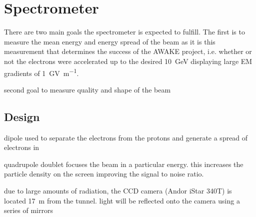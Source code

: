 
\section{Spectrometer}
\label{sec:spectrometer}

There are two main goals the spectrometer is expected to fulfill. The first is
to measure the mean energy and energy spread of the beam as it is this
measurement that determines the success of the AWAKE project, i.e.  whether or
not the electrons were accelerated up to the desired
\SI{10}{\giga\electronvolt} displaying large EM gradients of
\SI{1}{\giga\volt\per\meter}.

second goal to measure quality and shape of the beam


\subsection{Design}

dipole used to separate the electrons from the protons and generate a spread of
electrons in

quadrupole doublet focuses the beam in a particular energy. this increases the
particle density on the screen improving the signal to noise ratio.

due to large amounts of radiation, the CCD camera (Andor iStar 340T) is located
17~m from the tunnel. light will be reflected onto the camera using a series of
mirrors

